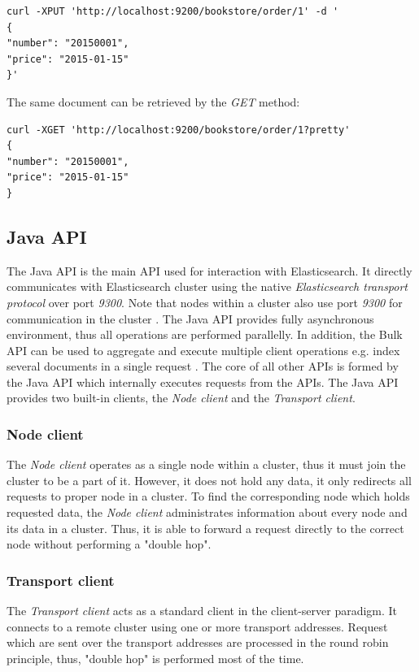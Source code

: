 \documentclass[12pt,oneside]{fithesis2}
\begin{document}
\begin{lstlisting}[caption = Example of indexing data in Elasticsearch, label = elastic_xput]
curl -XPUT 'http://localhost:9200/bookstore/order/1' -d '
{ 
"number": "20150001", 
"price": "2015-01-15"
}'
\end{lstlisting}

The same document can be retrieved by the \textit{GET} method:
\begin{lstlisting}[caption = Example of retrieving data from Elasticsearch, label = elastic_xget]
curl -XGET 'http://localhost:9200/bookstore/order/1?pretty'
{ 
"number": "20150001", 
"price": "2015-01-15"
}
\end{lstlisting}

\subsection{Java API}
The Java API is the main API used for interaction with Elasticsearch. It directly communicates with Elasticsearch cluster using the native \textit{Elasticsearch transport protocol} over port \textit{9300}. Note that nodes within a cluster also use port \textit{9300} for communication in the cluster \cite[Talking to Elasticsearch]{elasticsearch_defnitive_guide}. The Java API provides fully asynchronous environment, thus all operations are performed parallelly. In addition, the Bulk API can be used to aggregate and execute multiple client operations e.g. index several documents in a single request \cite[Java API]{elasticsearch_java_api_doc}. The core of all other APIs \cite{elasticsearch_doc} is formed by the Java API which internally executes requests from the APIs. The Java API provides two built-in clients, the \textit{Node client} and the \textit{Transport client}.

\subsubsection{Node client}
The \textit{Node client} operates as a single node within a cluster, thus it must join the cluster to be a part of it. However, it does not hold any data, it only redirects all requests to proper node in a cluster. To find the corresponding node which holds requested data, the \textit{Node client} administrates information about every node and its data in a cluster. Thus, it is able to forward a request directly to the correct node without performing a "double hop".

\subsubsection{Transport client}
\label{transport_client}
The \textit{Transport client} acts as a standard client in the client-server paradigm. It connects to a remote cluster using one or more transport addresses. Request which are sent over the transport addresses are processed in the round robin principle, thus, "double hop" is performed most of the time.
\end{document}
